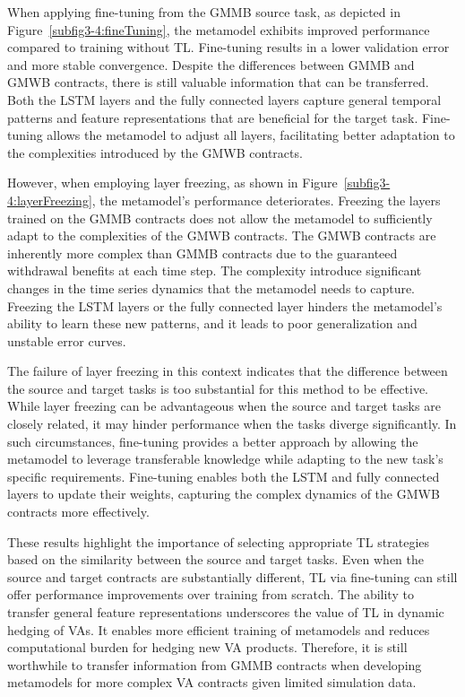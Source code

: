 When applying fine-tuning from the GMMB source task, as depicted in Figure~\ref{subfig3-4:fineTuning}, the metamodel exhibits improved performance compared to training without TL. 
Fine-tuning results in a lower validation error and more stable convergence. 
Despite the differences between GMMB and GMWB contracts, there is still valuable information that can be transferred. 
Both the LSTM layers and the fully connected layers capture general temporal patterns and feature representations that are beneficial for the target task. 
Fine-tuning allows the metamodel to adjust all layers, facilitating better adaptation to the complexities introduced by the GMWB contracts.

However, when employing layer freezing, as shown in Figure~\ref{subfig3-4:layerFreezing}, the metamodel's performance deteriorates.
Freezing the layers trained on the GMMB contracts does not allow the metamodel to sufficiently adapt to the complexities of the GMWB contracts. 
The GMWB contracts are inherently more complex than GMMB contracts due to the guaranteed withdrawal benefits at each time step.
The complexity introduce significant changes in the time series dynamics that the metamodel needs to capture.
Freezing the LSTM layers or the fully connected layer hinders the metamodel's ability to learn these new patterns, and it leads to poor generalization and unstable error curves.

The failure of layer freezing in this context indicates that the difference between the source and target tasks is too substantial for this method to be effective. 
While layer freezing can be advantageous when the source and target tasks are closely related, it may hinder performance when the tasks diverge significantly.
In such circumstances, fine-tuning provides a better approach by allowing the metamodel to leverage transferable knowledge while adapting to the new task's specific requirements. 
Fine-tuning enables both the LSTM and fully connected layers to update their weights, capturing the complex dynamics of the GMWB contracts more effectively.

These results highlight the importance of selecting appropriate TL strategies based on the similarity between the source and target tasks. 
Even when the source and target contracts are substantially different, TL via fine-tuning can still offer performance improvements over training from scratch. 
The ability to transfer general feature representations underscores the value of TL in dynamic hedging of VAs. 
It enables more efficient training of metamodels and reduces computational burden for hedging new VA products. 
Therefore, it is still worthwhile to transfer information from GMMB contracts when developing metamodels for more complex VA contracts given limited simulation data.

